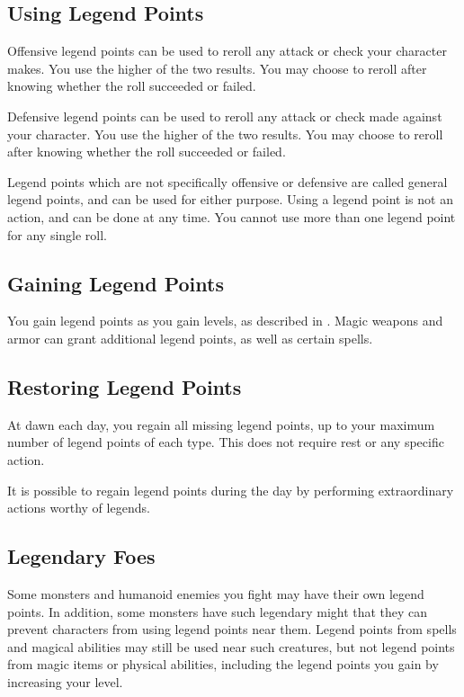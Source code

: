     \subsection{Using Legend Points}

        Offensive legend points can be used to reroll any attack or check your character makes.
        You use the higher of the two results.
        You may choose to reroll after knowing whether the roll succeeded or failed.

        Defensive legend points can be used to reroll any attack or check made against your character.
        You use the higher of the two results.
        You may choose to reroll after knowing whether the roll succeeded or failed.

        Legend points which are not specifically offensive or defensive are called general legend points, and can be used for either purpose.
        Using a legend point is not an action, and can be done at any time.
        You cannot use more than one legend point for any single roll.

    \subsection{Gaining Legend Points}

        You gain legend points as you gain levels, as described in .
        Magic weapons and armor can grant additional legend points, as well as certain spells.

    \subsection{Restoring Legend Points}

        At dawn each day, you regain all missing legend points, up to your maximum number of legend points of each type.
        This does not require rest or any specific action.

        It is possible to regain legend points during the day by performing extraordinary actions worthy of legends.

    \subsection{Legendary Foes}
        Some monsters and humanoid enemies you fight may have their own legend points.
        In addition, some monsters have such legendary might that they can prevent characters from using legend points near them.
        Legend points from spells and magical abilities may still be used near such creatures, but not legend points from magic items or physical abilities, including the legend points you gain by increasing your level.

